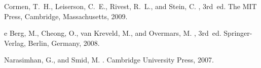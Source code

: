 \documentclass[a0,portrait]{a0poster}
\theoremstyle{definition}
\theoremstyle{plain}
\theoremstyle{definition}
\begin{document}
\begin{multicols}{2}
\begin{thebibliography}{10}
\begin{LTRbibitems}
\resetlatinfont

{\sc Cormen, T.~H., Leiserson, C.~E., Rivest, R.~L., and Stein, C.}
, 3rd~ed.
\newblock The {MIT} Press, Cambridge, Massachusetts, 2009.


{e Berg, M., Cheong, O., van Kreveld, M., and Overmars, M.}
, 3rd~ed.
\newblock Springer-Verlag, Berlin, Germany, 2008.

{\sc Narasimhan, G., and Smid, M.}
.
\newblock Cambridge University Press, 2007.
\end{LTRbibitems}

\end{thebibliography}
\end{multicols}
\end{document}
